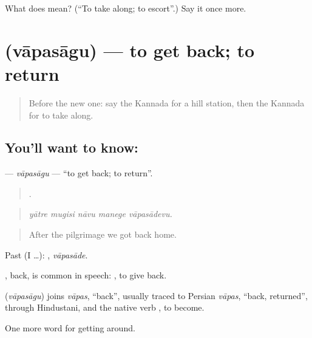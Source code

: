 \begin{tcolorbox}[breakable,colback=teal!4,colframe=teal!35!black,title={Before you move on}]
What does  mean? (\textquotedblleft{}To take along; to escort\textquotedblright{}.) Say it once more.
\end{tcolorbox}
\section[\texorpdfstring{\kn{ವಾಪಸಾಗು} (vāpasāgu)}{ವಾಪಸಾಗು (vāpasāgu)}]{ (vāpasāgu) — to get back; to return}

\label{lesson:KA-C458-vapasagu}



\begin{quote}
Before the new one: say the Kannada for a hill station, then the Kannada for to take along.
\end{quote}

\subsection*{You'll want to know: }
\textbf{} — \emph{vāpasāgu} — \textquotedblleft{}to get back; to return\textquotedblright{}.

\begin{quote}
    .
\end{quote}

\begin{quote}
\emph{yātre mugisi nāvu manege vāpasādevu.}
\end{quote}

\begin{quote}
After the pilgrimage we got back home.
\end{quote}

Past (I …): , \emph{vāpasāde}.

, back, is common in speech:  , to give back.

\begin{cousinweb}
\textbf{} (\emph{vāpasāgu}) joins \emph{vāpas}, \textquotedblleft{}back\textquotedblright{}, usually traced to Persian \emph{vāpas}, \textquotedblleft{}back, returned\textquotedblright{}, through Hindustani, and the native verb , to become.
\end{cousinweb}

\begin{grammarlens}[title={What you've built}]
One more word for getting around.
\end{grammarlens}

